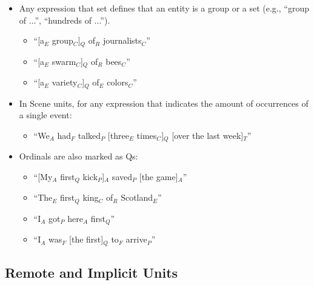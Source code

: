 \documentclass[11pt]{article}
\begin{document}
\begin{enumerate}
\begin{itemize}
\item Any expression that set defines that an entity is a group or a set (e.g., ``group of ...'', ``hundreds of ...'').

\begin{itemize}
\item  
``[a$_E$ group$_C$]$_Q$ of$_R$ journalists$_C$''
\item 
``[a$_E$ swarm$_C$]$_Q$ of$_R$ bees$_C$''
\item  
``[a$_E$ variety$_C$]$_Q$ of$_E$ colors$_C$''
   \end{itemize}

\item In Scene units, for any expression that indicates the amount of occurrences of a single event:

\begin{itemize}
\item
``We$_A$ had$_F$ talked$_P$ [three$_E$ times$_C$]$_Q$ [over the last week]$_T$''
\end{itemize}
 
\item Ordinals are also marked as Qs:

\begin{itemize}
\item
``[My$_A$ first$_Q$ kick$_P$]$_A$ saved$_P$ [the game]$_A$''
\item
``The$_E$ first$_Q$ king$_C$ of$_R$ Scotland$_E$''
\item
``I$_A$ got$_P$ here$_A$ first$_Q$''
\item
``I$_A$ was$_F$ [the first]$_Q$ to$_F$ arrive$_P$''
\end{itemize}
\end{itemize}

\end{enumerate}

\subsection*{Remote and Implicit Units}
\end{document}
